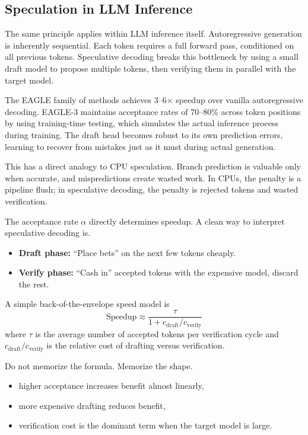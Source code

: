 \subsection{Speculation in LLM Inference}

The same principle applies within LLM inference itself. Autoregressive generation is inherently sequential. Each token requires a full forward pass, conditioned on all previous tokens. Speculative decoding \cite{leviathan2023fast, chen2023accelerating} breaks this bottleneck by using a small draft model to propose multiple tokens, then verifying them in parallel with the target model.

The EAGLE family of methods \cite{li2024eagle, li2024eagle2, li2025eagle3} achieves 3--6$\times$ speedup over vanilla autoregressive decoding. EAGLE-3 maintains acceptance rates of 70--80\% across token positions by using training-time testing, which simulates the actual inference process during training. The draft head becomes robust to its own prediction errors, learning to recover from mistakes just as it must during actual generation.

This has a direct analogy to CPU speculation. Branch prediction is valuable only when accurate, and mispredictions create wasted work. In CPUs, the penalty is a pipeline flush; in speculative decoding, the penalty is rejected tokens and wasted verification.

The acceptance rate $\alpha$ directly determines speedup. A clean way to interpret speculative decoding is.

\begin{itemize}
\item \textbf{Draft phase:} ``Place bets'' on the next few tokens cheaply.
\item \textbf{Verify phase:} ``Cash in'' accepted tokens with the expensive model, discard the rest.
\end{itemize}

A simple back-of-the-envelope speed model is
\[
\text{Speedup} \approx \frac{\tau}{1 + c_{\text{draft}}/c_{\text{verify}}}
\]
where $\tau$ is the average number of accepted tokens per verification cycle and $c_{\text{draft}}/c_{\text{verify}}$ is the relative cost of drafting versus verification.

Do not memorize the formula. Memorize the shape.
\begin{itemize}
\item higher acceptance increases benefit almost linearly,
\item more expensive drafting reduces benefit,
\item verification cost is the dominant term when the target model is large.
\end{itemize}

